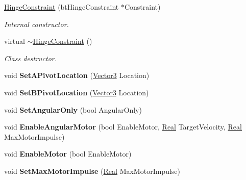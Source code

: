 \begin{DoxyCompactItemize}
\item 
\hyperlink{classphys_1_1HingeConstraint_ab326e7128413aa3b737b726b3513c8df}{HingeConstraint} (btHingeConstraint $\ast$Constraint)
\begin{DoxyCompactList}\small\item\em Internal constructor. \item\end{DoxyCompactList}\item 
virtual \hyperlink{classphys_1_1HingeConstraint_af97da06f82fa1903bb20393760f4ae34}{$\sim$HingeConstraint} ()
\begin{DoxyCompactList}\small\item\em Class destructor. \item\end{DoxyCompactList}\item 
\hypertarget{classphys_1_1HingeConstraint_afa922bdd01eaa8e8c1bbafff1c5f7500}{
void {\bfseries SetAPivotLocation} (\hyperlink{classphys_1_1Vector3}{Vector3} Location)}
\label{d3/d0d/classphys_1_1HingeConstraint_afa922bdd01eaa8e8c1bbafff1c5f7500}

\item 
\hypertarget{classphys_1_1HingeConstraint_a6891924d55abb8a68195b4f5b08420b4}{
void {\bfseries SetBPivotLocation} (\hyperlink{classphys_1_1Vector3}{Vector3} Location)}
\label{d3/d0d/classphys_1_1HingeConstraint_a6891924d55abb8a68195b4f5b08420b4}

\item 
\hypertarget{classphys_1_1HingeConstraint_af0c9120692422de58ba6d442a01f22b6}{
void {\bfseries SetAngularOnly} (bool AngularOnly)}
\label{d3/d0d/classphys_1_1HingeConstraint_af0c9120692422de58ba6d442a01f22b6}

\item 
\hypertarget{classphys_1_1HingeConstraint_a43fd81df8530a1bcee46fd52f8b47a28}{
void {\bfseries EnableAngularMotor} (bool EnableMotor, \hyperlink{namespacephys_af7eb897198d265b8e868f45240230d5f}{Real} TargetVelocity, \hyperlink{namespacephys_af7eb897198d265b8e868f45240230d5f}{Real} MaxMotorImpulse)}
\label{d3/d0d/classphys_1_1HingeConstraint_a43fd81df8530a1bcee46fd52f8b47a28}

\item 
\hypertarget{classphys_1_1HingeConstraint_a943ff31d46129143b66744abbb46086f}{
void {\bfseries EnableMotor} (bool EnableMotor)}
\label{d3/d0d/classphys_1_1HingeConstraint_a943ff31d46129143b66744abbb46086f}

\item 
\hypertarget{classphys_1_1HingeConstraint_a944b8ade0a8a1f4853566bc17ebb23ac}{
void {\bfseries SetMaxMotorImpulse} (\hyperlink{namespacephys_af7eb897198d265b8e868f45240230d5f}{Real} MaxMotorImpulse)}
\label{d3/d0d/classphys_1_1HingeConstraint_a944b8ade0a8a1f4853566bc17ebb23ac}


\end{DoxyCompactItemize}
